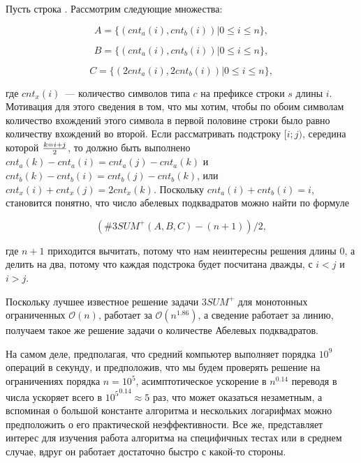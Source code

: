 Пусть строка . Рассмотрим следующие множества:

\begin{equation}
A = \{ (cnt_a(i), cnt_b(i)) | 0 \le i \le n \},
\end{equation}

\begin{equation}
B = \{ (cnt_a(i), cnt_b(i)) | 0 \le i \le n \},
\end{equation}

\begin{equation}
C = \{ (2cnt_a(i), 2cnt_b(i)) | 0 \le i \le n \},
\end{equation}


где $cnt_x(i)$~--- количество символов типа $c$ на префиксе строки $s$ длины $i$. Мотивация для этого сведения в том, что мы хотим, чтобы по обоим символам количество вхождений этого символа в первой половине строки было равно количеству вхождений во второй. Если рассматривать подстроку $[i; j)$, середина которой $k={i+j} \over 2$, то должно быть выполнено $cnt_a(k)-cnt_a(i)=cnt_a(j)-cnt_a(k)$ и $cnt_b(k)-cnt_b(i)=cnt_b(j)-cnt_b(k)$, или $cnt_x(i)+cnt_x(j)=2cnt_x(k)$. Поскольку $cnt_a(i)+cnt_b(i)=i$, становится понятно, что число абелевых подквадратов можно найти по формуле 

\begin{equation}
(\#3SUM^+(A, B, C) - (n+1)) / 2,
\end{equation}

где $n+1$ приходится вычитать, потому что нам неинтересны решения длины 0, а делить на два, потому что каждая подстрока будет посчитана дважды, с $i<j$ и $i>j$.

Поскольку лучшее известное решение задачи $3SUM^+$ для монотонных ограниченных $\mathcal{O}(n)$, работает за $\mathcal{O}(n^{1.86})$, а сведение работает за линию, получаем такое же решение задачи о количестве Абелевых подквадратов.

На самом деле, предполагая, что средний компьютер выполняет порядка $10^9$ операций в секунду, и предположив, что мы будем проверять решение на ограничениях порядка $n=10^5$, асимптотическое ускорение в $n^0.14$ переводя в числа ускоряет всего в ${10^5}^{0.14} \approx 5$ раз, что может оказаться незаметным, а вспоминая о большой константе алгоритма и нескольких логарифмах можно предположить о его практической неэффективности. Все же, представляет интерес для изучения работа алгоритма на специфичных тестах или в среднем случае, вдруг он работает достаточно быстро с какой-то стороны.

